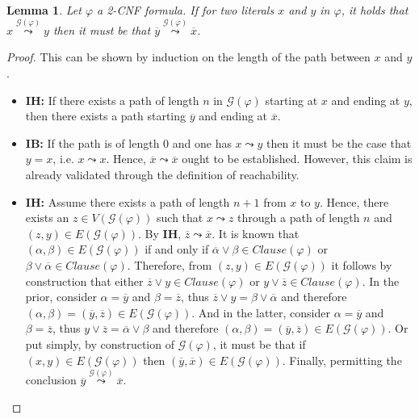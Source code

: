 \documentclass [11pt]{article}
\newcommand{\clau}{\mathit{Clause}}
\newtheorem{lemma}[theorem]{Lemma}
\newcommand{\reach}{\leadsto}
\newcommand{\sreach}[1]{\stackrel{#1}{\leadsto}}
\begin{document}
\begin{lemma}
\label{lem:inverse-path}
Let $\varphi$ a 2-CNF formula. If for two literals $x$ and $y$ in $\varphi$, it holds that $x\sreach{\mathcal{G}(\varphi)} y $ then it must be that $\overline{y} \sreach{\mathcal{G}(\varphi)} \overline{x}$.
\end{lemma}
\begin{proof}
This can be shown by induction on the length of the path between $x$ and $y$.
\begin{itemize}
\item \textbf{IH:} If there exists a path of length $n$ in $\mathcal{G}(\varphi)$ starting at $x$ and ending at $y$, then there exists a path starting $\overline{y}$ and ending at $\overline{x}$.
\item \textbf{IB:} If the path is of length $0$ and one has $x \reach y$ then it must be the case that $y = x$, i.e. $x \reach x$. 
Hence, $\overline{x} \reach \overline{x}$ ought to be established. However, this claim is already validated through the definition of reachability.
\item \textbf{IH:} Assume there exists a path of length $n+1$ from $x$ to $y$. Hence, there exists an $z \in V(\mathcal{G}(\varphi))$ such that $x \reach z$ through a path of length $n$ and $(z,y) \in E(\mathcal{G}(\varphi))$. By \textbf{IH}, $\overline{z} \reach \overline{x}$. It is known that $(\alpha, \beta) \in E(\mathcal{G}(\varphi))$ if and only if $\overline{\alpha} \lor  \beta \in \clau(\varphi)$ or  $\beta \lor \overline{\alpha}  \in \clau(\varphi)$.
Therefore, from $(z,y) \in E(\mathcal{G}(\varphi))$ it follows by construction that either $\overline{z} \lor y \in \clau(\varphi)$ or $y \lor \overline{z}  \in \clau(\varphi)$. In the prior, consider $\alpha=\overline{y}$ and $\beta = \overline{z}$, thus $\overline{z} \lor y= \beta \lor \overline{\alpha}$ and therefore $(\alpha, \beta)= (\overline{y}, \overline{z}) \in E(\mathcal{G}(\varphi))$. And in the latter, consider $\alpha=\overline{y}$ and $\beta = \overline{z}$, thus $y \lor \overline{z}= \overline{\alpha} \lor \beta$ and therefore $(\alpha, \beta)= (\overline{y}, \overline{z}) \in E(\mathcal{G}(\varphi))$. Or put simply, by construction of $\mathcal{G}(\varphi)$, it must be that if $(x,y) \in E(\mathcal{G}(\varphi))$ then $(\overline{y}, \overline{x}) \in E(\mathcal{G}(\varphi))$. Finally, permitting the conclusion $\overline{y} \sreach{\mathcal{G}(\varphi)} \overline{x}$.
\end{itemize}
\end{proof}
\end{document}
